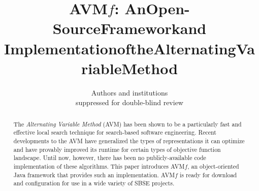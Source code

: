 \documentclass{llncs}
\newcommand{\AVM}{Alternating Variable Method\xspace}
\newcommand{\name}{AVM\hspace{-1pt}$f$\xspace}
\begin{document}
\title{\texorpdfstring{\name: An\:Open-Source\:Framework\:and\\$\!$Implementation\:of\:the\:Alternating\:Variable\:Method\vspace{-.5em}}{}}



\author{
        Authors and institutions\\
        suppressed for double-blind review
        \vspace{-1em}
}
\institute{}

\maketitle

\begin{abstract}
The {\it \AVM} (AVM) has been shown to be a particularly fast and effective local search technique for %
search-based software engineering.
%
Recent developments to the AVM have generalized the types of representations it can optimize and have provably improved its runtime for certain types of objective function landscape. Until now, however, there has been no publicly-available code implementation of these algorithms. This paper introduces \name, an object-oriented Java framework that provides such an implementation. \name is ready for download and configuration for use in a wide variety of SBSE projects.\vspace{-1ex}
\end{abstract}

\vspace{-1em}
\end{document}
